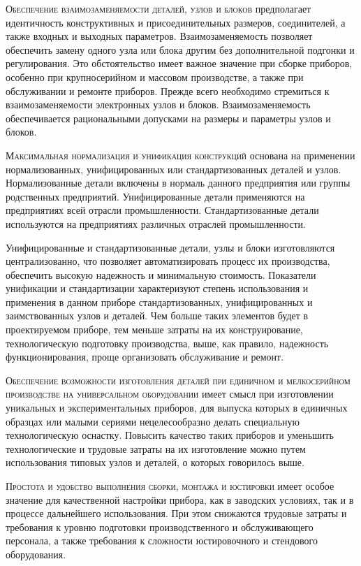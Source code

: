 \documentclass{tufte-book}
\begin{document}
\textsc{Обеспечение взаимозаменяемости деталей, узлов и блоков} предполагает идентичность конструктивных и присоединительных размеров, соединителей, а также входных и выходных параметров. Взаимозаменяемость позволяет обеспечить замену одного узла или блока другим без дополнительной подгонки и регулирования. Это обстоятельство имеет важное значение при сборке приборов, особенно при крупносерийном и массовом производстве, а также при обслуживании и ремонте приборов. Прежде всего необходимо стремиться к взаимозаменяемости электронных узлов и блоков. Взаимозаменяемость обеспечивается рациональными допусками на размеры и параметры узлов и блоков.

\textsc{Максимальная нормализация и унификация конструкций} основана на применении нормализованных, унифицированных или стандартизованных деталей и узлов. Нормализованные детали включены в нормаль данного предприятия или группы родственных предприятий. Унифицированные детали применяются на предприятиях всей отрасли промышленности. Стандартизованные детали используются на предприятиях различных отраслей промышленности.

Унифицированные и стандартизованные детали, узлы и блоки изготовляются централизованно, что позволяет автоматизировать процесс их производства, обеспечить высокую надежность и минимальную стоимость. Показатели унификации и стандартизации характеризуют степень использования и применения в данном приборе стандартизованных, унифицированных и заимствованных узлов и деталей. Чем больше таких элементов будет в проектируемом приборе, тем меньше затраты на их конструирование, технологическую подготовку производства, выше, как правило, надежность функционирования, проще организовать обслуживание и ремонт.

\textsc{Обеспечение возможности изготовления деталей при единичном и мелкосерийном производстве на универсальном оборудовании} имеет смысл при изготовлении уникальных и экспериментальных приборов, для выпуска которых в единичных образцах или малыми сериями нецелесообразно делать специальную технологическую оснастку. Повысить качество таких приборов и уменьшить технологические и трудовые затраты на их изготовление можно путем использования типовых узлов и деталей, о которых говорилось выше.

\textsc{Простота и удобство выполнения сборки, монтажа и юстировки} имеет особое значение для качественной настройки прибора, как в заводских условиях, так и в процессе дальнейшего использования. При этом снижаются трудовые затраты и требования к уровню подготовки производственного и обслуживающего персонала, а также требования к сложности юстировочного и стендового оборудования.
\end{document}
